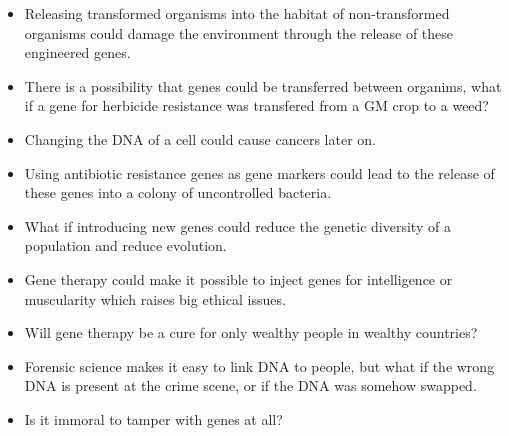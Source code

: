 \documentclass{article}
\begin{document}
\begin{itemize}
	
	\item Releasing transformed organisms into the habitat of non-transformed
	organisms could damage the environment through the release of these
	engineered genes.

	\item There is a possibility that genes could be transferred between
	organims, what if a gene for herbicide resistance was transfered from a GM
	crop to a weed?

	\item Changing the DNA of a cell could cause cancers later on.

	\item Using antibiotic resistance genes as gene markers could lead to the
	release of these genes into a colony of uncontrolled bacteria.

	\item What if introducing new genes could reduce the genetic diversity of a
	population and reduce evolution.

	\item Gene therapy could make it possible to inject genes for intelligence
	or muscularity which raises big ethical issues.

	\item Will gene therapy be a cure for only wealthy people in wealthy
	countries?

	\item Forensic science makes it easy to link DNA to people, but what if the
	wrong DNA is present at the crime scene, or if the DNA was somehow swapped.

	\item Is it immoral to tamper with genes at all?

\end{itemize}





\end{document}
